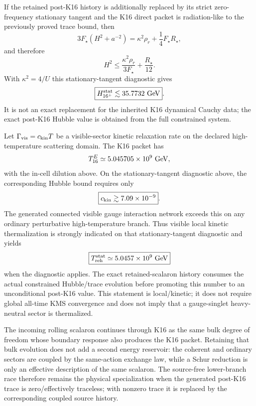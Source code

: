 \documentclass[12pt,a4paper]{article}
\begin{document}
\begin{corollary}
\label{p8:cor:v2134-post16-hubble-bound}
If the retained post-K16 history is additionally replaced by its strict
zero-frequency stationary tangent and the K16 direct packet is radiation-like
to the previously proved trace bound, then
\[
 3F_\star\left(H^2+a^{-2}\right)
 =\kappa^2\rho_r+\frac14F_\star R_\star,
\]
and therefore
\[
 \boxed{H^2\le\frac{\kappa^2\rho_r}{3F_\star}+\frac{R_\star}{12}}.
\]
With $\kappa^2=4/U$ this stationary-tangent diagnostic gives
\[
 \boxed{H_{16^+}^{\rm stat}\lesssim35.7732\ {\rm GeV}}.
\]
It is not an exact replacement for the inherited K16 dynamical Cauchy data;
the exact post-K16 Hubble value is obtained from the full constrained system.
\end{corollary}

\begin{corollary}
\label{p8:cor:v2134-visible-thermalization}
Let $\Gamma_{\rm vis}=c_{\rm kin}T$ be a visible-sector kinetic relaxation
rate on the declared high-temperature scattering domain.  The K16 packet has
\[
 T_{16}^{E}\simeq5.045705\times10^9\ {\rm GeV},
\]
with the in-cell dilution above.  On the stationary-tangent diagnostic above, the corresponding Hubble bound
requires only
\[
 \boxed{c_{\rm kin}\gtrsim7.09\times10^{-9}}.
\]
The generated connected visible gauge interaction network exceeds this on any
ordinary perturbative high-temperature branch.  Thus visible local kinetic thermalization is strongly indicated on that
stationary-tangent diagnostic and yields
\[
 \boxed{T_{\rm reh}^{\rm stat}\simeq5.0457\times10^9\ {\rm GeV}}
\]
when the diagnostic applies.  The exact retained-scalaron history consumes the
actual constrained Hubble/trace evolution before promoting this number to an
unconditional post-K16 value.  This statement is local/kinetic;
it does not require global all-time KMS convergence and does not imply that a
gauge-singlet heavy-neutral sector is thermalized.
\end{corollary}

\begin{remark}
\label{p8:rem:v2134-retained-scalar}
The incoming rolling scalaron continues through K16 as the same bulk degree of
freedom whose boundary response also produces the K16 packet.  Retaining that
bulk evolution does not add a second energy reservoir: the coherent and
ordinary sectors are coupled by the same-action exchange law, while a Schur
reduction is only an effective description of the same scalaron.  The
source-free lower-branch race therefore remains the physical specialization
when the generated post-K16 trace is zero/effectively traceless; with nonzero
trace it is replaced by the corresponding coupled source history.
\end{remark}
\end{document}

